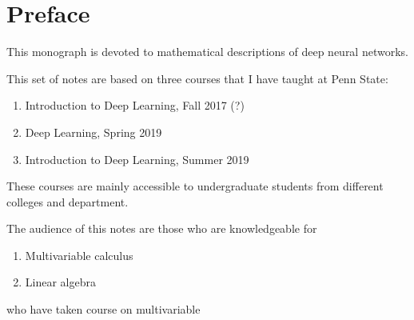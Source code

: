 \chapter*{Preface}
This monograph is devoted to mathematical descriptions of deep neural
networks. 

This set of notes are based on three courses that I have taught at Penn
State:
\begin{enumerate}
\item Introduction to Deep Learning, Fall 2017 (?)
\item Deep Learning, Spring 2019
\item Introduction to Deep Learning, Summer 2019
\end{enumerate}
These courses are mainly accessible to undergraduate students from
different colleges and department. 

The audience of this notes are those who are knowledgeable for
\begin{enumerate}
\item Multivariable calculus
\item Linear algebra
\end{enumerate}

who have
taken course on multivariable 


